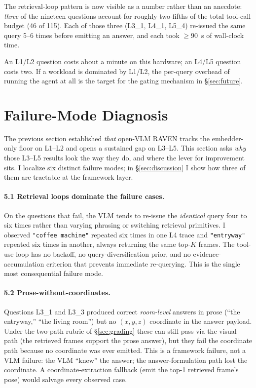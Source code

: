 \documentclass[12pt,letterpaper,oneside]{article}
\begin{document}
The retrieval-loop pattern is now visible as a number rather than an
anecdote: \emph{three} of the nineteen questions account for roughly
two-fifths of the total tool-call budget (46 of 115).  Each of those
three (L3\_1, L4\_1, L5\_4) re-issued the same query 5--6 times before
emitting an answer, and each took $\ge90$~s of wall-clock time.

An L1/L2 question costs about a minute on this hardware; an L4/L5
question costs two.  If a workload is dominated by L1/L2, the
per-query overhead of running the agent at all is the target for
the gating mechanism in \S\ref{sec:future}.

\section{Failure-Mode Diagnosis}\label{sec:failures}

The previous section established \emph{that} open-VLM RAVEN tracks
the embedder-only floor on L1--L2 and opens a sustained gap on
L3--L5.  This section asks \emph{why} those L3--L5 results look the
way they do, and where the lever for improvement sits.  I localize
six distinct failure modes; in \S\ref{sec:discussion} I show how
three of them are tractable at the framework layer.

\paragraph{5.1 Retrieval loops dominate the failure cases.}
On the questions that fail, the VLM tends to re-issue the
\emph{identical} query four to six times rather than varying phrasing
or switching retrieval primitives.  I observed
\texttt{"coffee machine"} repeated six times in one L4 trace and
\texttt{"entryway"} repeated six times in another, always returning
the same top-$K$ frames.  The tool-use loop has no backoff, no
query-diversification prior, and no evidence-accumulation criterion
that prevents immediate re-querying.  This is the single most
consequential failure mode.

\paragraph{5.2 Prose-without-coordinates.}
Questions L3\_1 and L3\_3 produced correct \emph{room-level} answers
in prose (``the entryway,'' ``the living room'') but no $(x, y, z)$
coordinate in the answer payload. Under the two-path rubric of
\S\ref{sec:grading} these can still pass via the visual path (the
retrieved frames support the prose answer), but they fail the
coordinate path because no coordinate was ever emitted. This is a
framework failure, not a VLM failure: the VLM ``knew'' the answer;
the answer-formulation path lost the coordinate. A
coordinate-extraction fallback (emit the top-1 retrieved frame's
pose) would salvage every observed case.
\end{document}
